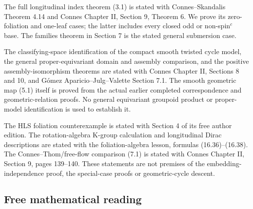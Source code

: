 \documentclass[
  11pt,
]{article}
\begin{document}
The full longitudinal index theorem (3.1) is stated with
Connes--Skandalis Theorem 4.14 and Connes Chapter II, Section 9, Theorem
6. We prove its zero-foliation and one-leaf cases; the latter includes
every closed odd or non-spin\(^{c}\) base. The families theorem in
Section 7 is the stated general submersion case.

The classifying-space identification of the compact smooth twisted cycle
model, the general proper-equivariant domain and assembly comparison,
and the positive assembly-isomorphism theorems are stated with Connes
Chapter II, Sections 8 and 10, and Gómez Aparicio--Julg--Valette Section
7.1. The smooth geometric map (5.1) itself is proved from the actual
earlier completed correspondence and geometric-relation proofs. No
general equivariant groupoid product or proper-model identification is
used to establish it.

The HLS foliation counterexample is stated with Section 4 of its free
author edition. The rotation-algebra K-group calculation and
longitudinal Dirac descriptions are stated with the foliation-algebra
lesson, formulas (16.36)--(16.38). The Connes--Thom/free-flow comparison
(7.1) is stated with Connes Chapter II, Section 9, pages 139--140. These
statements are not premises of the embedding-independence proof, the
special-case proofs or geometric-cycle descent.

\subsection{Free mathematical reading}\label{free-mathematical-reading}
\end{document}
